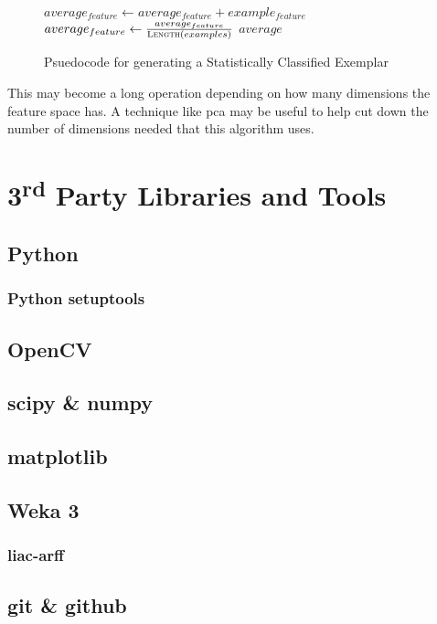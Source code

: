 \begin{figure}[h]
\begin{algorithmic}
\State $average_{feature} \gets average_{feature} + example_{feature}$
\EndFor
\EndFor
{}
\State$average_{feature} \gets \frac{average_{feature}}{\Call{Length}{examples}}$
\EndFor
\State \Return $average$
\EndFunction
\end{algorithmic}
\caption{Psuedocode for generating a Statistically Classified Exemplar}\label{fig:sce-psuedo}
\end{figure}

This may become a long operation depending on how many dimensions the feature space has. A
technique like \gls{pca} may be useful to help cut down the number of dimensions needed that this
algorithm uses.


\section{3\textsuperscript{rd} Party Libraries and Tools}

\subsection{Python}
\subsubsection{Python setuptools}

\subsection{OpenCV}

\subsection{scipy \& numpy}

\subsection{matplotlib}

\subsection{Weka 3}
\subsubsection{liac-arff}

\subsection{git \& github}


